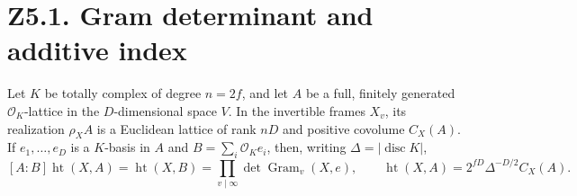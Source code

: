 \section*{Z5.1. Gram determinant and additive index}

\begin{lemma}\label{lem:P5-gram-realize}
Let $K$ be totally complex of degree $n=2f$, and let $A$ be a full,
finitely generated $\mathcal O_K$-lattice in the $D$-dimensional space
$V$. In the invertible frames $X_v$, its realization $\rho_X A$ is a
Euclidean lattice of rank $nD$ and positive covolume $C_X(A)$.
If $e_1,\ldots,e_D$ is a $K$-basis in $A$ and $B=\sum_i\mathcal O_K e_i$,
then, writing $\Delta=|\operatorname{disc}K|$,
\[
 [A:B]\operatorname{ht}(X,A)=\operatorname{ht}(X,B)
 =\prod_{v\mid\infty}\det\operatorname{Gram}_v(X,e),
 \qquad \operatorname{ht}(X,A)=2^{fD}\Delta^{-D/2}C_X(A).
\]
\end{lemma}
